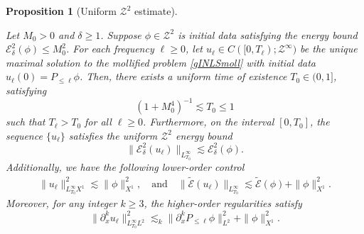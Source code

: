 \documentclass{amsart}
\newtheorem{proposition}{Proposition}[section]
\numberwithin{equation}{section}
\begin{document}
\begin{proposition}[Uniform $\mathcal{Z}^2$ estimate]\label{prop:apriori-Zk}

Let $M_0>0$ and $\delta\geq 1$. Suppose $\phi \in \mathcal{Z}^2$ is initial data satisfying the energy bound $\mathcal{E}^2_\delta(\phi)\leq M_0^2$. For each frequency $\ell \geq 0$, let $u_\ell \in C([0,T_\ell); \mathcal{Z}^\infty)$ be the unique maximal solution to the mollified problem \eqref{gINLSmoll} with initial data $u_\ell(0)=P_{\leq \ell}\phi$. Then, there exists a uniform time of existence $T_0 \in (0, 1]$, satisfying 
$$
    (1+M_0^4)^{-1} \lesssim T_0 \leq 1
$$
such that $T_\ell > T_0$ for all $\ell \geq 0$. Furthermore, on the interval $[0, T_0]$, the sequence $\{u_\ell\}$ satisfies the uniform $\mathcal{Z}^2$ energy bound
\begin{equation}\label{est:aprioriZ2}
\| \mathcal{E}^2_\delta(u_\ell) \|_{L^\infty_{T_0}} \lesssim \mathcal{E}^2_\delta(\phi).
\end{equation}
Additionally, we have the following lower-order control
\begin{align}\label{est:aprioriZ2'}
\| u_\ell \|_{L^\infty_{T_0}X^1}^2 \lesssim \| \phi \|_{X^1}^2, 
\quad \text{and}\quad
\| \widetilde{\mathcal{E}}(u_\ell) \|_{L^\infty_{T_0}} \lesssim \widetilde{\mathcal{E}}(\phi) + \| \phi \|_{X^1}^2. 
\end{align}
Moreover, for any integer $k \geq 3$, the higher-order regularities satisfy
\begin{equation}\label{est:aprioriZk}
\| \partial_x^k u_\ell \|_{L^\infty_{T_0}L^2}^2 \lesssim_k \| \partial_x^k P_{\leq \ell}\phi \|_{L^2}^2 + \| \phi \|_{X^1}^2.
\end{equation}
\end{proposition}
\end{document}

